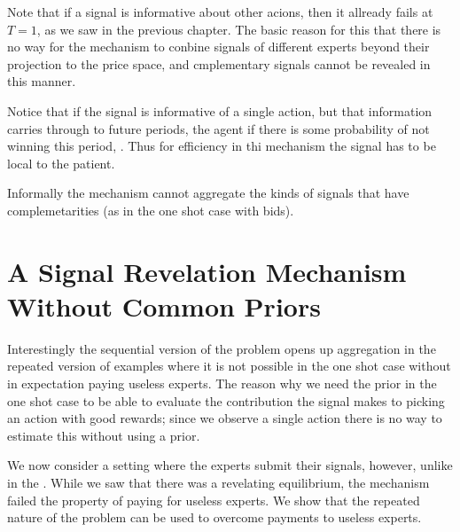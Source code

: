  Note that if a signal is informative about other acions, then it allready fails at $T=1$, as we saw in the previous chapter. The basic reason for this that there is no way for the mechanism to conbine signals of different experts beyond their projection to the price space, and cmplementary signals cannot be revealed in this manner. 

 Notice that if the signal is informative of a single action, but that information carries through to future periods, the agent if there is some probability of not winning this period, . Thus for efficiency in thi mechanism the signal has to be local to the patient.






Informally the mechanism cannot aggregate the kinds of signals that have complemetarities (as in the one shot case with bids).


\section{A Signal Revelation Mechanism Without Common Priors}

Interestingly the sequential version of the problem opens up aggregation in the repeated version of examples where it is not possible in the one shot case without in expectation paying useless experts. 
The reason why we need the prior in the one shot case to be able to evaluate the contribution the signal makes to picking an action with good rewards; since we observe a single action there is no way to estimate this without using a prior. 

We now consider a setting where the experts submit their signals, however, unlike in the .
 While we saw that there was a revelating equilibrium, the mechanism failed the property of paying for useless experts. We show that the repeated nature of the problem can be used to overcome payments to useless experts. 

